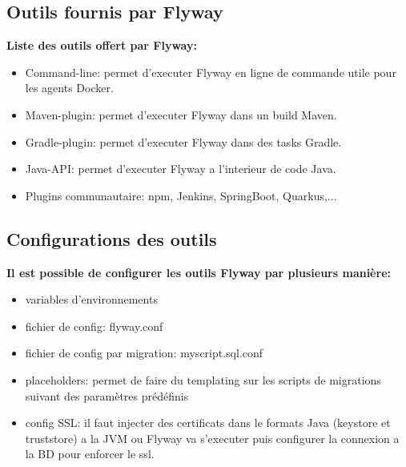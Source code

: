 \documentclass[slidestop,compress,11pt,xcolor=dvipsnames,french]{beamer}
\begin{document}
\subsection*{Outils fournis par Flyway}
\begin{frame}
\vspace{1cm}
\textbf {Liste des outils offert par Flyway: \\}
    \begin{itemize}
        \item Command-line: permet d'executer Flyway en ligne de commande utile pour les agents Docker.
        \item Maven-plugin: permet d'executer Flyway dans un build Maven.
        \item Gradle-plugin: permet d'executer Flyway dans des tasks Gradle.
        \item Java-API: permet d'executer Flyway a l'interieur de code Java.
        \item Plugins communautaire: npm, Jenkins, SpringBoot, Quarkus,...
    \end{itemize}
\end{frame} 

\subsection*{Configurations des outils}
\begin{frame}
\vspace{1cm}
\textbf {Il est possible de configurer les outils Flyway par plusieurs manière: \\}
    \begin{itemize}
        \item variables d'environnements 
        \item fichier de config: flyway.conf
        \item fichier de config par migration: myscript.sql.conf 
        \item placeholders: permet de faire du templating sur les scripts de migrations suivant des paramètres prédéfinis
        \item config SSL: il faut injecter des certificats dans le formats Java (keystore et truststore) a la JVM ou Flyway va s'executer puis configurer la connexion a la BD pour enforcer le ssl.
    \end{itemize}
\end{frame} 
\end{document}
